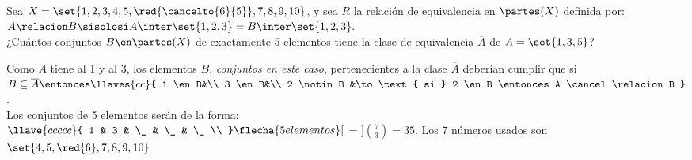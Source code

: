 \ejercicio
Sea $X = \set{1,2,3,4,5,\red{\cancelto{6}{5}},7,8,9,10}$, y sea $R$ la relación de equivalencia en $\partes(X)$ definida por:
$A \relacion B \sisolosi A \inter \set{1,2,3} = B \inter \set{1,2,3}.$\\
¿Cuántos conjuntos $B \en \partes(X)$ de exactamente 5 elementos tiene la clase de equivalencia $\overline A $ de $A = \set{1,3,5}$?

\separadorCorto

Como $A$ tiene al 1 y al 3, los elementos $B$, \textit{conjuntos en este caso}, pertenecientes a la clase $\overline A$
deberían cumplir que si $B \subseteq \overline A \entonces
	\llaves{cc}{
		1 \en B&\\
		3 \en B&\\
		2 \notin B &\to \text{ si } 2 \en B \entonces A \cancel\relacion B
	} $.\\
Los conjuntos de 5 elementos serán de la forma:\\
$\llave{c c c c c} %
	{
		1 & 3 & \_ & \_ & \_   \\
	} \flecha{5 elementos}[$ \inter {} \stackrel{\checkmark}= $] \binom{7}{3} = 35$. Los 7 números usados son $\set{4,5,\red{6},7,8,9,10}$ \\
